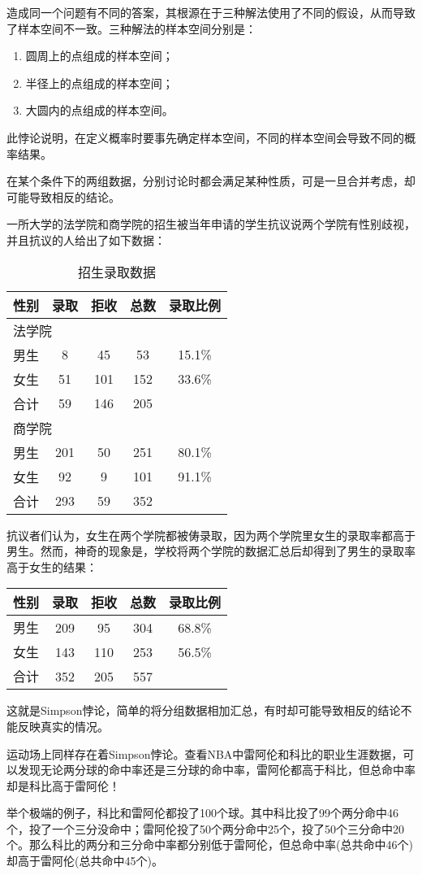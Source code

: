 造成同一个问题有不同的答案，其根源在于三种解法使用了不同的假设，从而导致了样本空间不一致。三种解法的样本空间分别是：
\begin{enumerate}
\item 圆周上的点组成的样本空间；
\item 半径上的点组成的样本空间；
\item 大圆内的点组成的样本空间。
\end{enumerate}

此悖论说明，在定义概率时要事先确定样本空间，不同的样本空间会导致不同的概率结果。


\begin{example}
  在某个条件下的两组数据，分别讨论时都会满足某种性质，可是一旦合并考虑，却可能导致相反的结论。

  一所大学的法学院和商学院的招生被当年申请的学生抗议说两个学院有性别歧视，并且抗议的人给出了如下数据：
  \begin{table}[htbp]
    \centering
    \caption{招生录取数据}
    \label{tab:simpson's-paradox}
    \begin{tabular}{ccccc}
      \hline
      性别 & 录取 & 拒收 & 总数 & 录取比例\\\hline      
      \multicolumn{5}{l}{法学院}\\\hline
      男生 & 8  &  45 &  53 & 15.1\%\\
      女生 & 51 & 101 & 152 & 33.6\%\\
      合计 & 59 & 146 & 205 &       \\
      \hline
      \multicolumn{5}{l}{商学院}\\\hline
      男生 & 201 & 50 & 251 & 80.1\%\\
      女生 &  92 &  9 & 101 & 91.1\%\\
      合计 & 293 & 59 & 352 &       \\
      \hline
    \end{tabular}
  \end{table}
  抗议者们认为，女生在两个学院都被俦录取，因为两个学院里女生的录取率都高于男生。然而，神奇的现象是，学校将两个学院的数据汇总后却得到了男生的录取率高于女生的结果：
  \begin{center}
    \begin{tabular}{ccccc}
      \hline
      性别 & 录取 & 拒收 & 总数 & 录取比例\\\hline      
      男生 & 209 &  95 & 304 & 68.8\%\\
      女生 & 143 & 110 & 253 & 56.5\%\\
      合计 & 352 & 205 & 557 &       \\
      \hline
    \end{tabular}
  \end{center}

  这就是Simpson悖论，简单的将分组数据相加汇总，有时却可能导致相反的结论不能反映真实的情况。
\end{example}

\begin{example}
  运动场上同样存在着Simpson悖论。查看NBA中雷阿伦和科比的职业生涯数据，可以发现无论两分球的命中率还是三分球的命中率，雷阿伦都高于科比，但总命中率却是科比高于雷阿伦！

  举个极端的例子，科比和雷阿伦都投了100个球。其中科比投了99个两分命中46个，投了一个三分没命中；雷阿伦投了50个两分命中25个，投了50个三分命中20个。那么科比的两分和三分命中率都分别低于雷阿伦，但总命中率(总共命中46个)却高于雷阿伦(总共命中45个)。
\end{example}